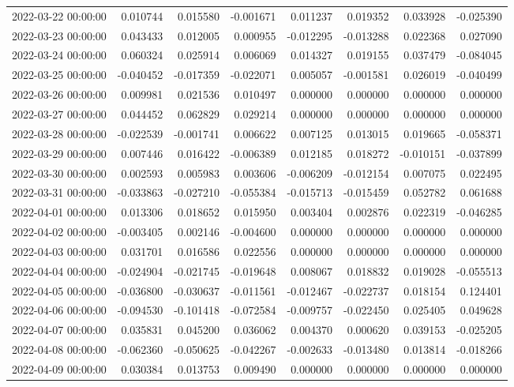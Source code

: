 \begin{tabular}{lrrrrrrr}
2022-03-22 00:00:00 & 0.010744 & 0.015580 & -0.001671 & 0.011237 & 0.019352 & 0.033928 & -0.025390 \\
2022-03-23 00:00:00 & 0.043433 & 0.012005 & 0.000955 & -0.012295 & -0.013288 & 0.022368 & 0.027090 \\
2022-03-24 00:00:00 & 0.060324 & 0.025914 & 0.006069 & 0.014327 & 0.019155 & 0.037479 & -0.084045 \\
2022-03-25 00:00:00 & -0.040452 & -0.017359 & -0.022071 & 0.005057 & -0.001581 & 0.026019 & -0.040499 \\
2022-03-26 00:00:00 & 0.009981 & 0.021536 & 0.010497 & 0.000000 & 0.000000 & 0.000000 & 0.000000 \\
2022-03-27 00:00:00 & 0.044452 & 0.062829 & 0.029214 & 0.000000 & 0.000000 & 0.000000 & 0.000000 \\
2022-03-28 00:00:00 & -0.022539 & -0.001741 & 0.006622 & 0.007125 & 0.013015 & 0.019665 & -0.058371 \\
2022-03-29 00:00:00 & 0.007446 & 0.016422 & -0.006389 & 0.012185 & 0.018272 & -0.010151 & -0.037899 \\
2022-03-30 00:00:00 & 0.002593 & 0.005983 & 0.003606 & -0.006209 & -0.012154 & 0.007075 & 0.022495 \\
2022-03-31 00:00:00 & -0.033863 & -0.027210 & -0.055384 & -0.015713 & -0.015459 & 0.052782 & 0.061688 \\
2022-04-01 00:00:00 & 0.013306 & 0.018652 & 0.015950 & 0.003404 & 0.002876 & 0.022319 & -0.046285 \\
2022-04-02 00:00:00 & -0.003405 & 0.002146 & -0.004600 & 0.000000 & 0.000000 & 0.000000 & 0.000000 \\
2022-04-03 00:00:00 & 0.031701 & 0.016586 & 0.022556 & 0.000000 & 0.000000 & 0.000000 & 0.000000 \\
2022-04-04 00:00:00 & -0.024904 & -0.021745 & -0.019648 & 0.008067 & 0.018832 & 0.019028 & -0.055513 \\
2022-04-05 00:00:00 & -0.036800 & -0.030637 & -0.011561 & -0.012467 & -0.022737 & 0.018154 & 0.124401 \\
2022-04-06 00:00:00 & -0.094530 & -0.101418 & -0.072584 & -0.009757 & -0.022450 & 0.025405 & 0.049628 \\
2022-04-07 00:00:00 & 0.035831 & 0.045200 & 0.036062 & 0.004370 & 0.000620 & 0.039153 & -0.025205 \\
2022-04-08 00:00:00 & -0.062360 & -0.050625 & -0.042267 & -0.002633 & -0.013480 & 0.013814 & -0.018266 \\
2022-04-09 00:00:00 & 0.030384 & 0.013753 & 0.009490 & 0.000000 & 0.000000 & 0.000000 & 0.000000 \\

\end{tabular}
